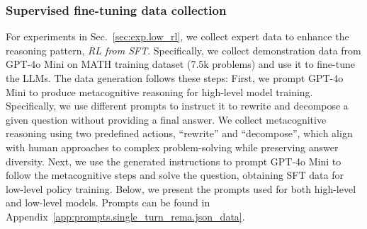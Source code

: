 \subsubsection{Supervised fine-tuning data collection} 
\label{app:exp_setting.single_turn_rema.sft_data}
For experiments in Sec.~\ref{sec:exp.low_rl}, we collect expert data to enhance the reasoning pattern, \ie \textit{RL from SFT}. Specifically, we collect demonstration data from GPT-4o Mini on MATH training dataset (7.5k problems) \citet{hendrycks2021measuring} and use it to fine-tune the LLMs. The data generation follows these steps: First, we prompt GPT-4o Mini to produce metacognitive reasoning for high-level model training. Specifically, we use different prompts to instruct it to rewrite and decompose a given question without providing a final answer. We collect metacognitive reasoning using two predefined actions, ``rewrite” and ``decompose”, which align with human approaches to complex problem-solving while preserving answer diversity. Next, we use the generated instructions to prompt GPT-4o Mini to follow the metacognitive steps and solve the question, obtaining SFT data for low-level policy training. Below, we present the prompts used for both high-level and low-level models.
Prompts can be found in Appendix~\ref{app:prompts.single_turn_rema.json_data}.



